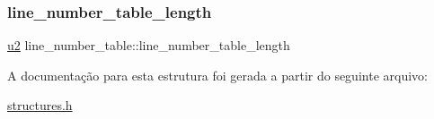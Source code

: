 \subsubsection{\texorpdfstring{line\+\_\+number\+\_\+table\+\_\+length}{line\_number\_table\_length}}
{\footnotesize\ttfamily \hyperlink{lista__operandos_8h_a732cde1300aafb73b0ea6c2558a7a54f}{u2} line\+\_\+number\+\_\+table\+::line\+\_\+number\+\_\+table\+\_\+length}



A documentação para esta estrutura foi gerada a partir do seguinte arquivo\+:\begin{DoxyCompactItemize}
\item 
\hyperlink{structures_8h}{structures.\+h}\end{DoxyCompactItemize}
